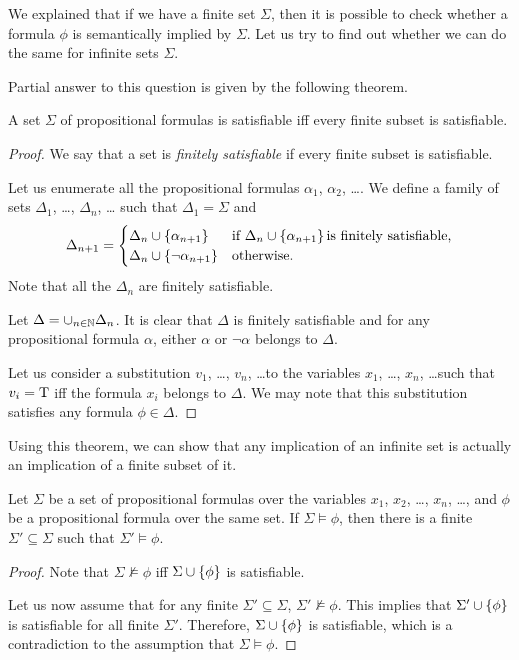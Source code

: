 We explained that if we have a finite set $\Sigma$, then it is possible to check
whether a formula $\phi$ is semantically implied by $\Sigma$. Let us try to find
out whether we can do the same for infinite sets $\Sigma$.

Partial answer to this question is given by the following theorem.
\begin{theorem}
  A set $\Sigma$ of propositional formulas is satisfiable iff every finite
  subset is satisfiable.
\end{theorem}
\begin{proof}
  We say that a set is \emph{finitely satisfiable} if every finite subset
  is satisfiable.

  Let us enumerate all the propositional formulas $\alpha_1$, $\alpha_2$, \dots.
  We define a family of sets $\Delta_1$, \dots, $\Delta_n$, \dots
  such that $\Delta_1 = \Sigma$ and
  \[
    \Delta_{n + 1} =
    \begin{cases}
      \Delta_n \cup \set{\alpha_{n + 1}} & \text{if }
        \Delta_n \cup \set{\alpha_{n + 1}} \text{is finitely satisfiable,} \\
      \Delta_n \cup \set{\lnot \alpha_{n + 1}} & \text{otherwise.}
    \end{cases}
  \]
  Note that all the $\Delta_n$ are finitely satisfiable.

  Let $\Delta = \cup_{n \in {\mathbb{N}}} \Delta_n$. It is clear that $\Delta$ is
  finitely satisfiable and for any propositional formula $\alpha$,
  either $\alpha$ or $\lnot \alpha$ belongs to $\Delta$.

  Let us consider a substitution $v_1$, \dots, $v_n$, \dots to the variables
  $x_1$, \dots, $x_n$, \dots such that $v_i = \text{T}$ iff the formula $x_i$
  belongs to $\Delta$. We may note that this substitution satisfies any
  formula $\phi \in \Delta$.
\end{proof}

Using this theorem, we can show that any implication of an infinite set is
actually an implication of a finite subset of it.
\begin{corollary}
  Let $\Sigma$ be a set of propositional formulas over the variables
  $x_1$, $x_2$, \dots, $x_n$, \dots, and $\phi$ be a propositional formula
  over the same set. If $\Sigma \models \phi$, then there is a finite
  $\Sigma' \subseteq \Sigma$ such that $\Sigma' \models \phi$.
\end{corollary}
\begin{proof}
  Note that $\Sigma \not\models \phi$ iff $\Sigma \cup \set{\phi}$ is
  satisfiable.

  Let us now assume that for any finite $\Sigma' \subseteq \Sigma$,
  $\Sigma' \not\models \phi$. This implies that $\Sigma' \cup \set{\phi}$
  is satisfiable for all finite $\Sigma'$. Therefore, $\Sigma \cup \set{\phi}$
  is satisfiable, which is a contradiction to the assumption that
  $\Sigma \models \phi$.
\end{proof}

